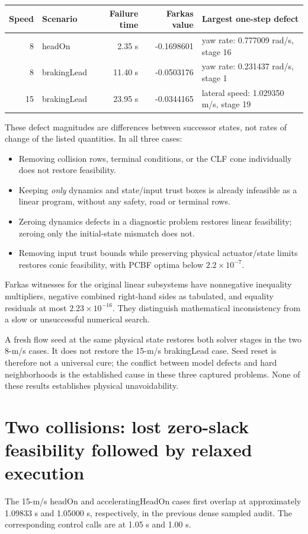 \documentclass[11pt]{article}
\begin{document}
\begin{center}\small
\begin{tabular}{r l r r l}
\toprule
Speed & Scenario & Failure time & Farkas value & Largest one-step defect\\
\midrule
8 & headOn & 2.35 s & -0.1698601 & yaw rate: 0.777009 rad/s, stage 16\\
8 & brakingLead & 11.40 s & -0.0503176 & yaw rate: 0.231437 rad/s, stage 1\\
15 & brakingLead & 23.95 s & -0.0344165 & lateral speed: 1.029350 m/s, stage 19\\
\bottomrule
\end{tabular}\end{center}
These defect magnitudes are differences between successor states, not rates
of change of the listed quantities. In all three cases:
\begin{itemize}
\item Removing collision rows, terminal conditions, or the CLF cone individually
  does not restore feasibility.
\item Keeping \emph{only} dynamics and state/input trust boxes is already
  infeasible as a linear program, without any safety, road or terminal rows.
\item Zeroing dynamics defects in a diagnostic problem restores linear
  feasibility; zeroing only the initial-state mismatch does not.
\item Removing input trust bounds while preserving physical actuator/state
  limits restores conic feasibility, with PCBF optima below $2.2\times10^{-7}$.
\end{itemize}
Farkas witnesses for the original linear subsystems have nonnegative inequality
multipliers, negative combined right-hand sides as tabulated, and equality
residuals at most $2.23\times10^{-16}$. They distinguish mathematical
inconsistency from a slow or unsuccessful numerical search.

A fresh flow seed at the same physical state restores both solver stages in
the two 8-m/s cases. It does not restore the 15-m/s brakingLead case. Seed
reset is therefore not a universal cure; the conflict between model defects
and hard neighborhoods is the established cause in these three captured
problems. None of these results establishes physical unavoidability.

\section{Two collisions: lost zero-slack feasibility followed by relaxed execution}
The 15-m/s headOn and acceleratingHeadOn cases first overlap at approximately
1.09833 s and 1.05000 s, respectively, in the previous dense sampled audit.
The corresponding control calls are at 1.05 s and 1.00 s.
\end{document}
